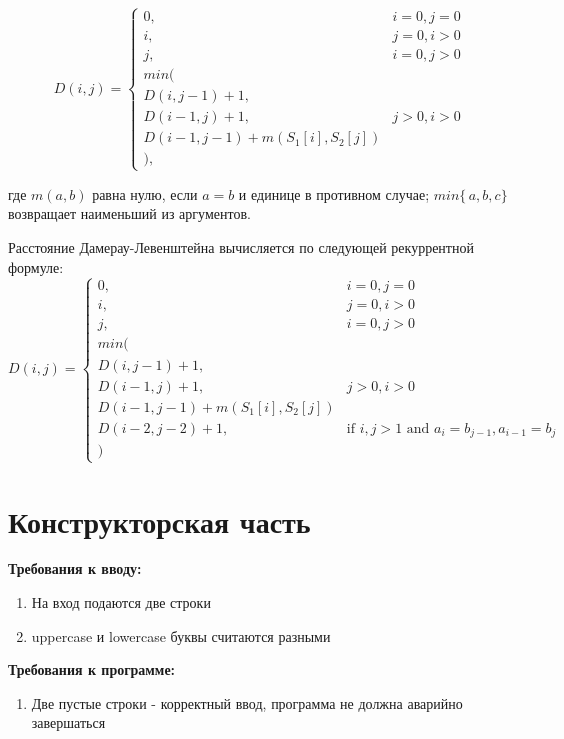 ﻿\documentclass[12pt]{report}
\begin{document}
\begin{displaymath}
D(i,j) = \left\{ \begin{array}{ll}
 0, & \textrm{$i = 0, j = 0$}\\
 i, & \textrm{$j = 0, i > 0$}\\
 j, & \textrm{$i = 0, j > 0$}\\
min(\\
D(i,j-1)+1,\\
D(i-1, j) +1, &\textrm{$j>0, i>0$}\\
D(i-1, j-1) + m(S_{1}[i], S_{2}[j])\\
),
  \end{array} \right.
\end{displaymath}

где $m(a,b)$ равна нулю, если $a=b$ и единице в противном случае; $min\{\,a,b,c\}$ возвращает наименьший из аргументов.

Расстояние Дамерау-Левенштейна вычисляется по следующей рекуррентной формуле:
\begin{displaymath}
D(i,j) = \left\{ \begin{array}{ll}
 0, & \textrm{$i = 0, j = 0$}\\
 i, & \textrm{$j = 0, i > 0$}\\
 j, & \textrm{$i = 0, j > 0$}\\
min(\\
D(i,j-1)+1,\\
D(i-1, j) +1, &\textrm{$j>0, i>0$}\\
D(i-1, j-1) + m(S_{1}[i], S_{2}[j])\\
D(i-2, j-2) + 1, &\textrm{if $i,j>1$ and $a_{i} = b_{j-1},a_{i-1}=b_{j} $}\\
)
  \end{array} \right.
\end{displaymath}



\chapter{Конструкторская часть}
\textbf{Требования к вводу:}
\begin{enumerate}
  	\item На вход подаются две строки
	\item uppercase и lowercase буквы считаются разными
\end{enumerate}
\textbf{Требования к программе:}
\begin{enumerate}
  	\item Две пустые строки - корректный ввод, программа не должна аварийно завершаться
\end{enumerate}
\end{document}
